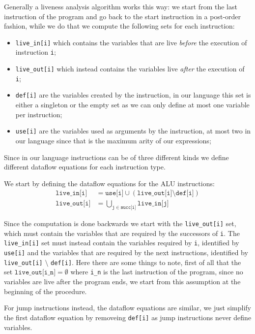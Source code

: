 Generally a liveness analysis algorithm works this way:
we start from the last instruction of the program and go back to the start instruction in a post-order fashion, while we do that we compute the following sets for each instruction:
\begin{itemize}
  \item \texttt{live\_in[i]} which contains the variables that are live \textit{before} the execution of instruction \texttt i;
  \item \texttt{live\_out[i]} which instead contains the variables live \textit{after} the execution of \texttt i;
  \item \texttt{def[i]} are the variables created by the instruction, in our language this set is either a singleton or the empty set as we can only define at most one variable per instruction;
  \item \texttt{use[i]} are the variables used as arguments by the instruction, at most two in our language since that is the maximum arity of our expressions;
\end{itemize}

Since in our language instructions can be of three different kinds we define different dataflow equations for each instruction type.

We start by defining the dataflow equations for the ALU instructions:
\begin{align*}
  \texttt{live\_in[i]} &= \texttt{use[i]} \cup (\texttt{live\_out[i]} \setminus \texttt{def[i]}) \\
  \texttt{live\_out[i]} &= \bigcup \limits_{\texttt j \in \texttt{succ[i]}} \texttt{live\_in[j]}
\end{align*}

Since the computation is done backwards we start with the \texttt{live\_out[i]} set, which must contain the variables that are required by the successors of \texttt i. The
\texttt{live\_in[i]} set must instead contain the variables required by \texttt i, identified by \texttt{use[i]} and the variables that are required by the next instructions, identified by \texttt{live\_out[i]} $\setminus$ \texttt{def[i]}.
Here there are some things to note, first of all that the set $\texttt{live\_out[i\_n]} = \emptyset$ where \texttt{i\_n} is the last instruction of the program, since no variables are live after the program ends, we start from this assumption at the beginning of the procedure.

For jump instructions instead, the dataflow equations are similar, we just simplify the first dataflow equation by removeing \texttt{def[i]} as jump instructions never define variables.

